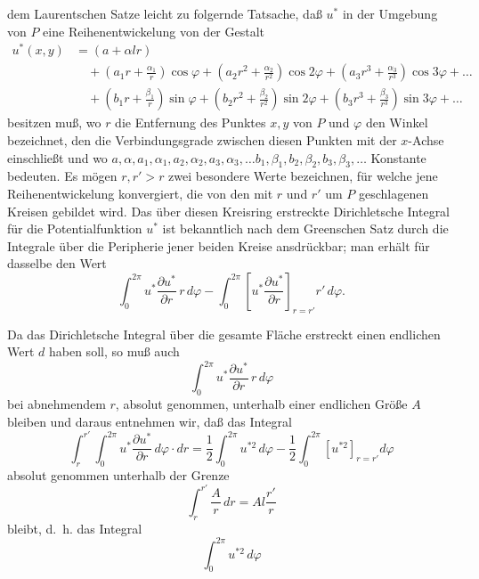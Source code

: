 \documentclass{article}
\begin{document}
dem Laurentschen Satze leicht zu folgernde Tatsache, daß $u^*$ in der Umgebung von $P$ eine Reihenentwickelung von der Gestalt
\[
\begin{aligned}
u^*(x, y) &= (a + \alpha l r) \\
&\quad + \left(a_1 r + \frac{\alpha_1}{r}\right) \cos \varphi + \left(a_2 r^2 + \frac{\alpha_2}{r^2}\right) \cos 2\varphi + \left(a_3 r^3 + \frac{\alpha_3}{r^3}\right) \cos 3\varphi + \dots \\
&\quad + \left(b_1 r + \frac{\beta_1}{r}\right) \sin \varphi + \left(b_2 r^2 + \frac{\beta_2}{r^2}\right) \sin 2\varphi + \left(b_3 r^3 + \frac{\beta_3}{r^3}\right) \sin 3\varphi + \dots
\end{aligned}
\]
besitzen muß, wo $r$ die Entfernung des Punktes $x, y$ von $P$ und $\varphi$ den Winkel bezeichnet, den die Verbindungsgrade zwischen diesen Punkten mit der $x$-Achse einschließt und wo $a, \alpha, a_1, \alpha_1, a_2, \alpha_2, a_3, \alpha_3, \dots b_1, \beta_1, b_2, \beta_2, b_3, \beta_3, \dots$ Konstante bedeuten. Es mögen $r, r'>r$ zwei besondere Werte bezeichnen, für welche jene Reihenentwickelung konvergiert, die von den mit $r$ und $r'$ um $P$ geschlagenen Kreisen gebildet wird. Das über diesen Kreisring erstreckte Dirichletsche Integral für die Potentialfunktion $u^*$ ist bekanntlich nach dem Greenschen Satz durch die Integrale über die Peripherie jener beiden Kreise ansdrückbar; man erhält für dasselbe den Wert
\[
\int_0^{2\pi} u^* \frac{\partial u^*}{\partial r}\,r\,d\varphi - \int_0^{2\pi} \left[ u^* \frac{\partial u^*}{\partial r} \right]_{r=r'} r'\,d\varphi.
\]

Da das Dirichletsche Integral über die gesamte Fläche erstreckt einen endlichen Wert $d$ haben soll, so muß auch
\[
\int_0^{2\pi} u^* \frac{\partial u^*}{\partial r}\,r\,d\varphi
\]
bei abnehmendem $r$, absolut genommen, unterhalb einer endlichen Größe $A$ bleiben und daraus entnehmen wir, daß das Integral
\[
\int_r^{r'} \int_0^{2\pi} u^* \frac{\partial u^*}{\partial r}\,d\varphi \cdot dr = \frac{1}{2} \int_0^{2\pi} u^{*2}\,d\varphi - \frac{1}{2} \int_0^{2\pi} \left[ u^{*2} \right]_{r=r'} d\varphi
\]
absolut genommen unterhalb der Grenze
\[
\int_r^{r'} \frac{A}{r}\,dr = A l \frac{r'}{r}
\]
bleibt, d.~h. das Integral
\[
\int_0^{2\pi} u^{*2}\,d\varphi
\]
\end{document}
